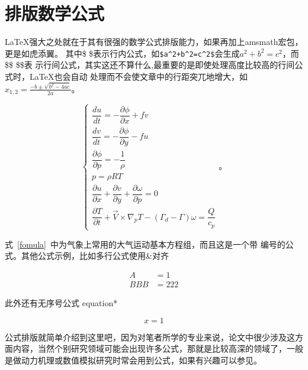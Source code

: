 \section{排版数学公式}

\LaTeX 强大之处就在于其有很强的数学公式排版能力，如果再加上amsmath宏包，更是如虎添翼。
其中\$  \$表示行内公式，如\verb|$a^2+b^2=c^2$|会生成$a^2+b^2=c^2$，而\$\$  \$\$表
示行间公式，其实这还不算什么,最重要的是即使处理高度比较高的行间公式时，\LaTeX 也会自动
处理而不会使文章中的行距突兀地增大，如$x_{1,2}= \frac{-b\pm \sqrt{b^2-4ac}}{2a}$。

\begin{equation}\label{fomula}
    \begin{cases}
        \dfrac{du}{dt}=-\dfrac{\partial \phi}{\partial x}+fv \\[1.5ex]
        \dfrac{dv}{dt}=-\dfrac{\partial \phi}{\partial y}-fu \\[1.5ex]
        \dfrac{\partial \phi}{\partial p}=-\dfrac{1}{\rho}   \\[1.5ex]
        p= \rho RT                                           \\[1.5ex]
        \dfrac{\partial u}{\partial x}+\dfrac{\partial v}{\partial y}+
        \dfrac{\partial \omega}{\partial p}=0                \\[1.5ex]
        \dfrac{\partial T}{\partial t}+\overrightarrow{V}\times \nabla_pT-(\Gamma_d-\Gamma)\omega=\dfrac{Q}{c_p}
    \end{cases}
    \text{。}
\end{equation}

式~\ref{fomula}~中为气象上常用的大气运动基本方程组，而且这是一个带
编号的公式。其他公式示例，比如多行公式使用\&对齐

\begin{equation}
    \begin{aligned}
        A   & =1   \\
        BBB & =222
    \end{aligned}
\end{equation}

此外还有无序号公式 equation*

\begin{equation*}
    x=1
\end{equation*}

公式排版就简单介绍到这里吧，因为对笔者所学的专业来说，论文中很少涉及这方面内容，当然个别研究领域可能会出现许多公式，那就是比较高深的领域了，一般是做动力机理或数值模拟研究时常会用到公式，如果有兴趣可以参见。

